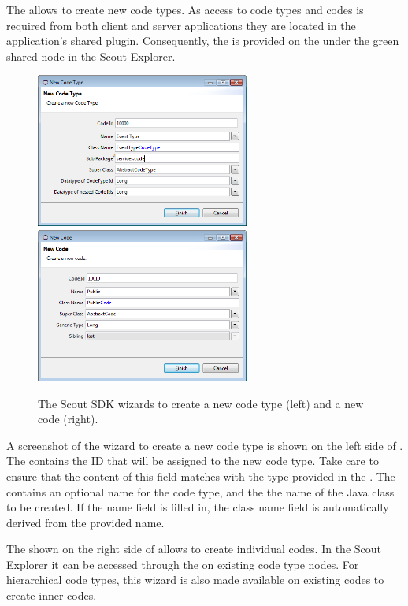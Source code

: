 \documentclass[a4paper,10pt,twoside]{book}
\begin{document}
The  allows to create new code types. 
As access to code types and codes is required from both client and server applications they are located in the application's shared plugin. 
Consequently, the  is provided on the  under the green shared node in the Scout Explorer. 

\begin{figure}
\includegraphics[width=7cm]{wizard_code_type.png} \hspace{5mm}
\includegraphics[width=7cm]{wizard_code.png}
\caption{The Scout SDK wizards to create a new code type (left) and a new code (right).}
\end{figure}

A screenshot of the wizard to create a new code type is shown on the left side of . 
The  contains the ID that will be assigned to the new code type. 
Take care to ensure that the content of this field matches with the type provided in the . 
The  contains an optional name for the code type, and the  the name of the Java class to be created. 
If the name field is filled in, the class name field is automatically derived from the provided name. 

The  shown on the right side of  allows to create individual codes. 
In the Scout Explorer it can be accessed through the  on existing code type nodes. 
For hierarchical code types, this wizard is also made available on existing codes to create inner codes. 
\end{document}

